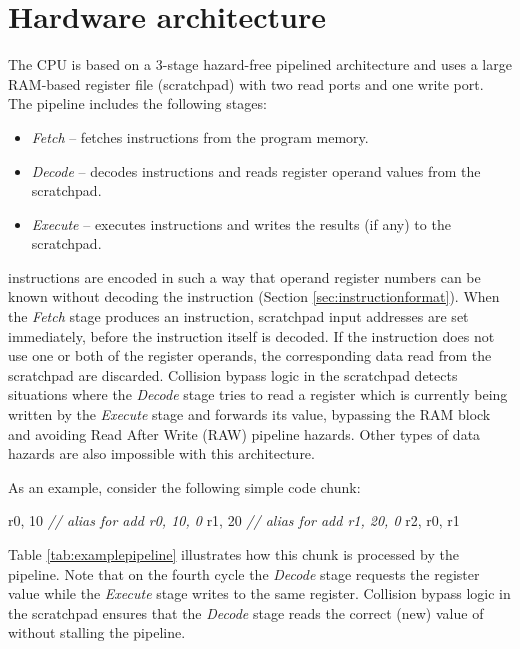 \documentclass[a4paper,12pt,twoside,extrafontsizes]{memoir}
\begin{document}
\chapter{Hardware architecture}
\label{ch:pipeline}

The \lxp{} CPU is based on a 3-stage hazard-free pipelined architecture and uses a large RAM-based register file (scratchpad) with two read ports and one write port. The pipeline includes the following stages:

\begin{itemize}
	\item\emph{Fetch} -- fetches instructions from the program memory.
	\item\emph{Decode} -- decodes instructions and reads register operand values from the scratchpad.
	\item\emph{Execute} -- executes instructions and writes the results (if any) to the scratchpad.
\end{itemize}

\lxp{} instructions are encoded in such a way that operand register numbers can be known without decoding the instruction (Section \ref{sec:instructionformat}). When the \emph{Fetch} stage produces an instruction, scratchpad input addresses are set immediately, before the instruction itself is decoded. If the instruction does not use one or both of the register operands, the corresponding data read from the scratchpad are discarded. Collision bypass logic in the scratchpad detects situations where the \emph{Decode} stage tries to read a register which is currently being written by the \emph{Execute} stage and forwards its value, bypassing the RAM block and avoiding Read After Write (RAW) pipeline hazards. Other types of data hazards are also impossible with this architecture.

As an example, consider the following simple code chunk:

\begin{codepar}
     r0, 10 \emph{// alias for add r0, 10, 0}
     r1, 20 \emph{// alias for add r1, 20, 0}
     r2, r0, r1
\end{codepar}

Table \ref{tab:examplepipeline} illustrates how this chunk is processed by the \lxp{} pipeline. Note that on the fourth cycle the \emph{Decode} stage requests the  register value while the \emph{Execute} stage writes to the same register. Collision bypass logic in the scratchpad ensures that the \emph{Decode} stage reads the correct (new) value of  without stalling the pipeline.
\end{document}
